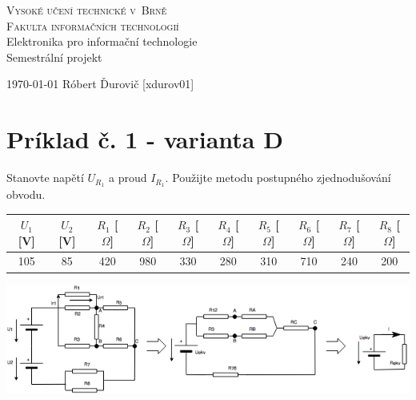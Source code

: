 \documentclass[a4paper,11pt,titlepage]{article}
\begin{document}
\begin{titlepage}

\begin{center}
    {\Huge\textsc{Vysoké učení technické v~Brně}}\\
        \medskip
    {\huge\textsc{Fakulta informačních technologií}}\\
    {\LARGE 	Elektronika pro informační technologie}\\
        \medskip
    {\Huge Semestrální projekt}\\
\end{center}

{\LARGE \today \hfill
Róbert Ďurovič [xdurov01]}

\end{titlepage}

\section{Príklad č. 1 - varianta D}

Stanovte napětí $U_{R_1}$ a proud $I_{R_1}$. Použijte metodu postupného zjednodušování obvodu.

\vspace{5mm}

\begin{tabular}{ |c|c|c|c|c|c|c|c|c|c| } \hline
    $U_1$ [V] & $U_2$ [V] & $R_1$ [$\Omega$] & $R_2$ [$\Omega$] & $R_3$ [$\Omega$] & $R_4$ [$\Omega$] & $R_5$ [$\Omega$] & $R_6$ [$\Omega$] & $R_7$ [$\Omega$] & $R_8$ [$\Omega$]\\ \hline
    105 & 85 & 420 & 980 & 330 & 280 & 310 & 710 & 240 & 200 \\ \hline
\end{tabular}

\vspace{5mm}

\includegraphics[scale=0.7]{dia.png}

\vspace{5mm}
\end{document}
